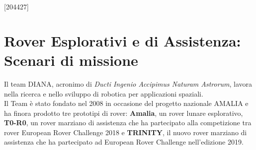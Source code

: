 \documentclass[%
corpo=11pt,
twoside,
 stile=classica,
oldstyle,
greek,%
]{toptesi}
\begin{document}



\begin{frontespizio}
\nomeateneo{}%
\FacoltaDi{}%
\facolta[III]{}%
\renewcommand*\IDlabel{\\\quad Matricola: }%
[204427]%
\end{frontespizio}







\mainmatter
\tablespagetrue\figurespagetrue %

\indici
\chapter{Rover Esplorativi e di Assistenza: Scenari di missione}
Il team DIANA, acronimo di  \textit{Ducti Ingenio Accipimus Naturam Astrorum}, lavora nella ricerca e nello sviluppo di robotica per applicazioni spaziali.\\
Il Team è stato fondato nel 2008 in occasione del progetto nazionale AMALIA e ha finora prodotto tre prototipi di rover: \textbf{Amalia}, un rover lunare esplorativo, \textbf{T0-R0}, un rover marziano di assistenza che ha partecipato alla competizione tra rover European Rover Challenge 2018 e \textbf{TRINITY}, il nuovo rover marziano di assistenza che ha partecipato ad European Rover Challenge nell'edizione 2019.
\end{document}
